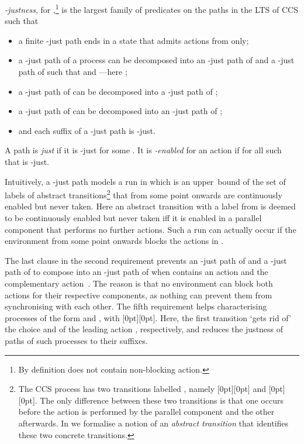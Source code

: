 \documentclass[smallcondensed]{svjour3}
\newcommand{\plat}[1]{\raisebox{0pt}[0pt][0pt]{#1}}  \def\precond#1{{\vphantom{#1}}^\bullet #1}
\begin{document}
\begin{definition}\label{df:just path}\rm
\emph{-justness}, for ,\footnote{By definition  does not contain non-blocking action.}
 is the largest family of predicates on the paths in the LTS of CCS such that
\begin{itemize}
\vspace{-1ex}
\item a finite -just path ends in a state that admits actions from  only;
\item a -just path of a process  can be decomposed into an -just path of  and a -just
  path of  such that  and ---here
  ;
\item a -just path of
   can be decomposed into a -just path of ;
\item a -just path of  can be decomposed into an
  -just path of ; 
\item and each suffix of a -just path is -just.
\vspace{-1ex}
\end{itemize}
A path  is \emph{just} if it is -just for some .
It is \emph{-enabled} for an action  if  for all  such that  is -just.
\end{definition}
Intuitively, a -just path models a run in which  is an upper~bound of the set of labels of
abstract transitions\footnote{The CCS process  has two transitions labelled , namely
\plat{} and \plat{}. The only difference between these two transitions
  is that one occurs before the action  is performed by the parallel component and the other
  afterwards. In \cite{GH14} we formalise a notion of an \emph{abstract transition} that
  identifies these two concrete transitions.} that from some point onwards are continuously enabled but never taken.
Here an {abstract transition} with a label from  is deemed to be continuously enabled but never
taken iff it is enabled in a parallel component that performs no further actions.
Such a run can actually occur if the environment from some point
onwards blocks the actions in .

The last clause in the second requirement prevents an -just path of  and a -just path of
 to compose into an -just path of  when  contains an action  and 
the complementary action~. The reason is that no environment can block both actions for
their respective components, as nothing can prevent them from synchronising with each other.
The fifth requirement helps characterising processes of the form  and , with  \plat{}.
Here, the first transition `gets rid of' the choice and of the leading action , respectively, 
and reduces the justness of paths of such processes to their suffixes.
\end{document}
